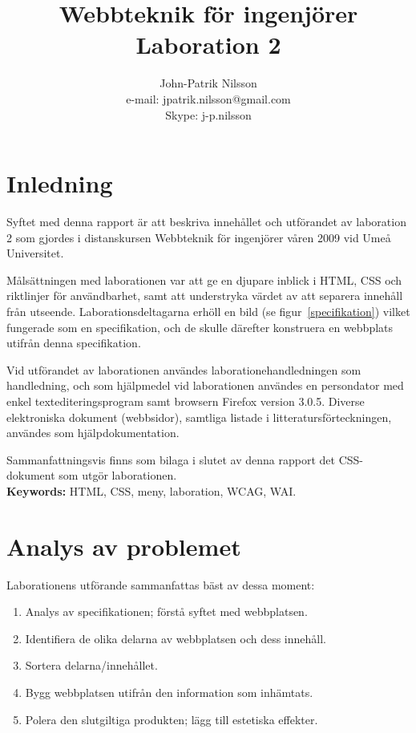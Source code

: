 \documentclass[a4paper,10pt]{article}
\title{Webbteknik för ingenjörer \\
	Laboration 2}
\author{John-Patrik Nilsson \\
	e-mail: jpatrik.nilsson@gmail.com \\
	Skype: j-p.nilsson}
\date{}
\begin{document}
\maketitle

\pagestyle{empty}
\thispagestyle{empty}

\section{Inledning}

Syftet med denna rapport är att beskriva innehållet och utförandet av laboration 2 som gjordes i distanskursen Webbteknik för ingenjörer våren 2009 vid Umeå Universitet.

Målsättningen med laborationen var att ge en djupare inblick i HTML, CSS och riktlinjer för användbarhet, samt att understryka värdet av att separera innehåll från utseende. Laborationsdeltagarna erhöll en bild (se figur~\ref{specifikation}) vilket fungerade som en specifikation, och de skulle därefter konstruera en webbplats utifrån denna specifikation.

Vid utförandet av laborationen användes laborationehandledningen som handledning, och som hjälpmedel vid laborationen användes en persondator med enkel textediteringsprogram samt browsern Firefox version 3.0.5. Diverse elektroniska dokument (webbsidor), samtliga listade i litteratursförteckningen, användes som hjälpdokumentation.

Sammanfattningsvis finns som bilaga i slutet av denna rapport det CSS-dokument som utgör laborationen. \\

\textbf{Keywords:} HTML, CSS, meny, laboration, WCAG, WAI.

\section{Analys av problemet}

Laborationens utförande sammanfattas bäst av dessa moment:

\begin{enumerate}
	\item Analys av specifikationen; förstå syftet med webbplatsen.
	\item Identifiera de olika delarna av webbplatsen och dess innehåll.
	\item Sortera delarna/innehållet.
	\item Bygg webbplatsen utifrån den information som inhämtats.
	\item Polera den slutgiltiga produkten; lägg till estetiska effekter.
\end{enumerate}
\end{document}
